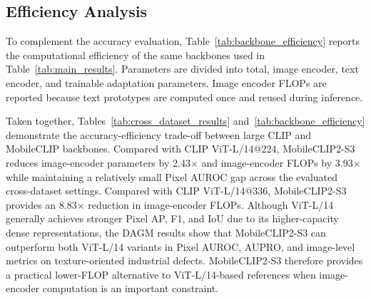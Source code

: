 \documentclass[10pt]{article}
\begin{document}






\subsection{Efficiency Analysis}

To complement the accuracy evaluation, Table~\ref{tab:backbone_efficiency} reports the computational efficiency of the same backbones used in Table~\ref{tab:main_results}. Parameters are divided into total, image encoder, text encoder, and trainable adaptation parameters. Image encoder FLOPs are reported because text prototypes are computed once and reused during inference.

\begin{table}[H]
\centering
\caption{Backbone efficiency comparison under the proposed LDA framework.
Image encoder FLOPs are reported in GFLOPs.
Trainable parameters include the LDA head and object-agnostic learnable prompt tokens.}
\label{tab:backbone_efficiency}
\end{table}

Taken together, Tables~\ref{tab:cross_dataset_results} and~\ref{tab:backbone_efficiency} demonstrate the accuracy-efficiency trade-off between large CLIP and MobileCLIP backbones. Compared with CLIP ViT-L/14@224, MobileCLIP2-S3 reduces image-encoder parameters by 2.43$\times$ and image-encoder FLOPs by 3.93$\times$ while maintaining a relatively small Pixel AUROC gap across the evaluated cross-dataset settings. Compared with CLIP ViT-L/14@336, MobileCLIP2-S3 provides an 8.83$\times$ reduction in image-encoder FLOPs. Although ViT-L/14 generally achieves stronger Pixel AP, F1, and IoU due to its higher-capacity dense representations, the DAGM results show that MobileCLIP2-S3 can outperform both ViT-L/14 variants in Pixel AUROC, AUPRO, and image-level metrics on texture-oriented industrial defects. MobileCLIP2-S3 therefore provides a practical lower-FLOP alternative to ViT-L/14-based references when image-encoder computation is an important constraint.
\end{document}
